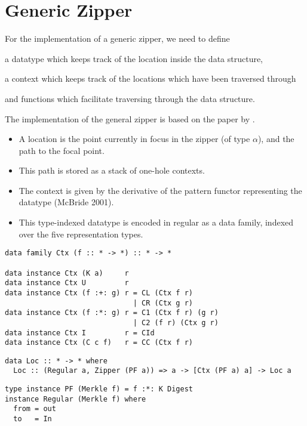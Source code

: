 \section{Generic Zipper}

For the implementation of a generic zipper, we need to define
\begin{enumerate*}[label=(\Alph*)]
  \item a datatype which keeps track of the location inside the data structure,
  \item a context which keeps track of the locations which have been traversed through
  \item and functions which facilitate traversing through the data structure.
\end{enumerate*}
The implementation of the general zipper is based on the paper  by \citeauthor{bransen2013generic}\cite{bransen2013generic}.

\begin{itemize}
  \item A location is the point currently in focus in the zipper (of type $\alpha$), and the path to the focal point. 
  \item This path is stored as a stack of one-hole contexts. 
  \item The context is given by the derivative of the pattern functor representing the datatype (McBride 2001). 
  \item This type-indexed datatype is encoded in regular as a data family, indexed over the five representation types.
\end{itemize}

\begin{verbatim}
data family Ctx (f :: * -> *) :: * -> *

data instance Ctx (K a)     r
data instance Ctx U         r
data instance Ctx (f :+: g) r = CL (Ctx f r)
                              | CR (Ctx g r)
data instance Ctx (f :*: g) r = C1 (Ctx f r) (g r)
                              | C2 (f r) (Ctx g r)
data instance Ctx I         r = CId
data instance Ctx (C c f)   r = CC (Ctx f r)
\end{verbatim}

\begin{verbatim}
data Loc :: * -> * where
  Loc :: (Regular a, Zipper (PF a)) => a -> [Ctx (PF a) a] -> Loc a
\end{verbatim}

\begin{verbatim}
type instance PF (Merkle f) = f :*: K Digest
instance Regular (Merkle f) where
  from = out
  to   = In
\end{verbatim}

